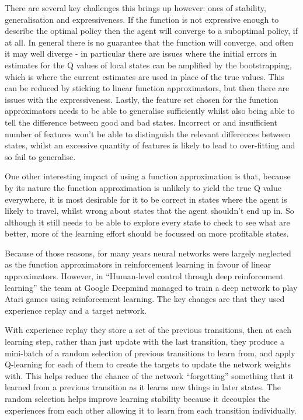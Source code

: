 There are several key challenges this brings up however: ones of stability, generalisation and expressiveness. If the function is not expressive enough to describe the optimal policy then the agent will converge to a suboptimal policy, if at all. In general there is no guarantee that the function will converge, and often it may well diverge - in particular there are issues where the initial errors in estimates for the Q values of local states can be amplified by the bootstrapping, which is where the current estimates are used in place of the true values. This can be reduced by sticking to linear function approximators, but then there are issues with the expressiveness. Lastly, the feature set chosen for the function approximators needs to be able to generalise sufficiently whilst also being able to tell the difference between good and bad states. Incorrect or and insufficient number of features won't be able to distinguish the relevant differences between states, whilst an excessive quantity of features is likely to lead to over-fitting and so fail to generalise.

One other interesting impact of using a function approximation is that, because by its nature the function approximation is unlikely to yield the true Q value everywhere, it is most desirable for it to be correct in states where the agent is likely to travel, whilst wrong about states that the agent shouldn't end up in. So although it still needs to be able to explore every state to check to see what are better, more of the learning effort should be focussed on more profitable states.

Because of those reasons, for many years neural networks were largely neglected as the function approximators in reinforcement learning in favour of linear approximators. However, in ``Human-level control through deep reinforcement learning'' \cite{atariDQN} the team at Google Deepmind managed to train a deep network to play Atari games using reinforcement learning. The key changes are that they used experience replay and a target network. 

With experience replay they store a set of the previous transitions, then at each learning step, rather than just update with the last transition, they produce a mini-batch of a random selection of previous transitions to learn from, and apply Q-learning for each of them to create the targets to update the network weights with. This helps reduce the chance of the network ``forgetting'' something that it learned from a previous transition as it learns new things in later states. The random selection helps improve learning stability because it decouples the experiences from each other allowing it to learn from each transition individually. 

